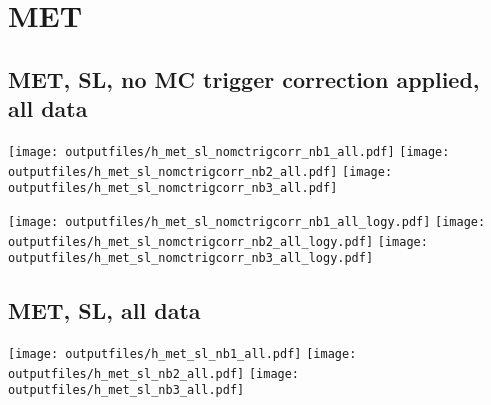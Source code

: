 \documentclass[11pt]{article}
\begin{document}







    \section{MET}
     \subsection{ MET, SL, no MC trigger correction applied, all data}

    \noindent
     \texttt{[image: outputfiles/h\_met\_sl\_nomctrigcorr\_nb1\_all.pdf]}
     \texttt{[image: outputfiles/h\_met\_sl\_nomctrigcorr\_nb2\_all.pdf]}
     \texttt{[image: outputfiles/h\_met\_sl\_nomctrigcorr\_nb3\_all.pdf]}

    \noindent
     \texttt{[image: outputfiles/h\_met\_sl\_nomctrigcorr\_nb1\_all\_logy.pdf]}
     \texttt{[image: outputfiles/h\_met\_sl\_nomctrigcorr\_nb2\_all\_logy.pdf]}
     \texttt{[image: outputfiles/h\_met\_sl\_nomctrigcorr\_nb3\_all\_logy.pdf]}


     \subsection{ MET, SL, all data}

    \noindent
     \texttt{[image: outputfiles/h\_met\_sl\_nb1\_all.pdf]}
     \texttt{[image: outputfiles/h\_met\_sl\_nb2\_all.pdf]}
     \texttt{[image: outputfiles/h\_met\_sl\_nb3\_all.pdf]}
\end{document}
